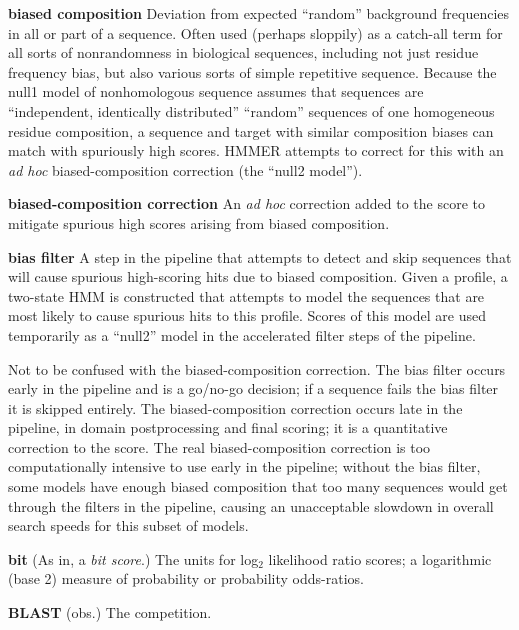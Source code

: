 \begin{wideitem}
\item[\textbf{biased composition}] Deviation from expected ``random''
  background frequencies in all or part of a sequence. Often used
  (perhaps sloppily) as a catch-all term for all sorts of
  nonrandomness in biological sequences, including not just residue
  frequency bias, but also various sorts of simple repetitive
  sequence. Because the null1 model of nonhomologous sequence assumes
  that sequences are ``independent, identically distributed''
  ``random'' sequences of one homogeneous residue composition, a
  sequence and target with similar composition biases can match with
  spuriously high scores. HMMER attempts to correct for this with an
  \emph{ad hoc} biased-composition correction (the ``null2 model'').

\item[\textbf{biased-composition correction}]
  An \emph{ad hoc} correction added to the score to mitigate spurious
  high scores arising from biased composition. 
  

\item[\textbf{bias filter}] A step in the pipeline that attempts to
  detect and skip sequences that will cause spurious high-scoring hits
  due to biased composition. Given a profile, a two-state HMM is
  constructed that attempts to model the sequences that are most
  likely to cause spurious hits to this profile. Scores of this model
  are used temporarily as a ``null2'' model in the accelerated filter
  steps of the pipeline. 

  Not to be confused with the biased-composition correction. The bias
  filter occurs early in the pipeline and is a go/no-go decision; if a
  sequence fails the bias filter it is skipped entirely. The
  biased-composition correction occurs late in the pipeline, in domain
  postprocessing and final scoring; it is a quantitative correction to
  the score. The real biased-composition correction is too
  computationally intensive to use early in the pipeline; without the
  bias filter, some models have enough biased composition that too
  many sequences would get through the filters in the pipeline,
  causing an unacceptable slowdown in overall search speeds for this
  subset of models.

\item[\textbf{bit}] (As in, a \emph{bit score}.) The units for log$_2$
  likelihood ratio scores; a logarithmic (base 2) measure of
  probability or probability odds-ratios.

\item[\textbf{BLAST}] (obs.) The competition.


\end{wideitem}
